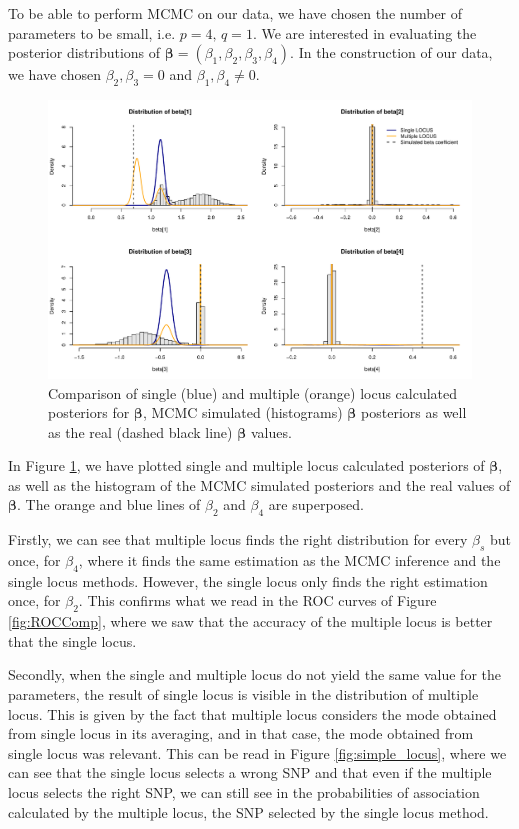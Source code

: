 \documentclass[a4paper, 11pt]{report}
\numberwithin{equation}{chapter}
\begin{document}
To be able to perform MCMC on our data, we have chosen the number of parameters to be small, i.e. $p=4,\, q=1$. We are interested in evaluating the posterior distributions of $\boldsymbol{\beta} = (\beta_1, \beta_2, \beta_3, \beta_4)$. In the construction of our data, we have chosen $\beta_2, \beta_3 = 0$ and $\beta_1, \beta_4 \neq 0$.
\begin{figure}[h]
\includegraphics[width=\textwidth, bb=0 0 800px 600px]{images/no_annealing.pdf}
\caption{\label{fig:no_ann}Comparison of single (blue) and multiple (orange) locus calculated posteriors for $\boldsymbol{\beta}$, MCMC simulated (histograms) $\boldsymbol{\beta}$ posteriors as well as the real (dashed black line) $\boldsymbol{\beta}$ values.}
\end{figure}

In Figure \ref{fig:no_ann}, we have plotted single and multiple locus calculated posteriors of $\boldsymbol{\beta}$, as well as the histogram of the MCMC simulated posteriors and the real values of $\boldsymbol{\beta}$. The orange and blue lines of $\beta_2$ and $\beta_4$ are superposed.

Firstly, we can see that multiple locus finds the right distribution for every $\beta_s$ but once, for $\beta_4$, where it finds the same estimation as the MCMC inference and the single locus methods. However, the single locus only finds the right estimation once, for $\beta_2$. This confirms what we read in the ROC curves of Figure \ref{fig:ROCComp}, where we saw that the accuracy of the multiple locus is better that the single locus.

Secondly, when the single and multiple locus do not yield the same value for the parameters, the result of single locus is visible in the distribution of multiple locus. This is given by the fact that multiple locus considers the mode obtained from single locus in its averaging, and in that case, the mode obtained from single locus was relevant. This can be read in Figure \ref{fig:simple_locus}, where we can see that the single locus selects a wrong SNP and that even if the multiple locus selects the right SNP, we can still see in the probabilities of association calculated by the multiple locus, the SNP selected by the single locus method.
\end{document}
